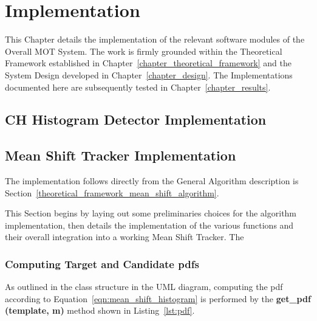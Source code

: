 \chapter{Implementation}\label{chapter_implementation}

This Chapter details the implementation of the relevant software modules of the
Overall MOT System. The work is firmly grounded within the Theoretical Framework
established in Chapter~\ref{chapter_theoretical_framework} and the System Design
developed in Chapter~\ref{chapter_design}. The Implementations documented here
are subsequently tested in Chapter~\ref{chapter_results}.


\section{CH Histogram Detector Implementation}\label{implementation_ch}

\section{Mean Shift Tracker Implementation}\label{implementation_mean_shift_tracker}
The implementation follows directly from the General Algorithm description is
Section~\ref{theoretical_framework_mean_shift_algorithm}.

This Section begins by laying out some preliminaries choices for the algorithm
implementation, then details the implementation of the various functions and
their overall integration into a working Mean Shift Tracker. The  

\subsection{Computing Target and Candidate pdfs}
As outlined in the class structure in the UML diagram, %
computing the pdf according to Equation~\ref{eqn:mean_shift_histogram} is
performed by the \textbf{get\_pdf (template, m)} method shown in
Listing~\ref{lst:pdf}.

